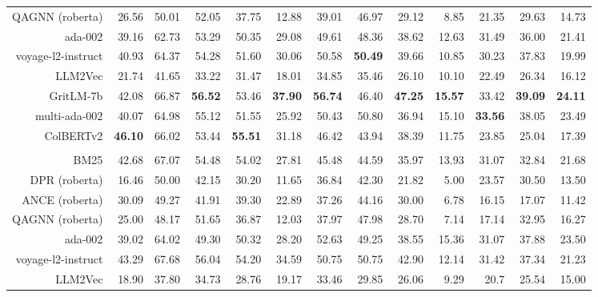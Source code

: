 \begin{table}[t]
{\begin{tabular}{r|rrrr|rrrr|rrrr}
        QAGNN (roberta) & 26.56 & 50.01 & 52.05 & 37.75 & 12.88 & 39.01 & 46.97 & 29.12 & 8.85 & 21.35 & 29.63 & 14.73 \\
        ada-002 & 39.16 & 62.73 & 53.29 & 50.35 & 29.08 & 49.61 & 48.36 & 38.62 & 12.63 & 31.49 & 36.00 & 21.41 \\
        voyage-l2-instruct & 40.93 & 64.37 & 54.28 & 51.60 & 30.06 &  50.58 & \textbf{50.49} & 39.66 & 10.85 & 30.23 & 37.83 & 19.99 \\ 
        LLM2Vec & 21.74 & 41.65 & 33.22 & 31.47 & 18.01 & 34.85 & 35.46 & 26.10 & 10.10 & 22.49 & 26.34 & 16.12 \\
        GritLM-7b & 42.08 & 66.87 & \textbf{56.52} & 53.46 & \textbf{37.90} & \textbf{56.74} & 46.40 & \textbf{47.25} & \textbf{15.57} & 33.42 & \textbf{39.09} & \textbf{24.11} \\
        multi-ada-002 & 40.07 & 64.98 & 55.12 & 51.55 & 25.92 & 50.43 & 50.80 & 36.94 & 15.10 & \textbf{33.56} & 38.05 & 23.49 \\
        ColBERTv2 & \textbf{46.10} & 66.02 & 53.44 & \textbf{55.51} & 31.18 & 46.42 & 43.94 & 38.39 & 11.75 & 23.85 & 25.04 & 17.39 \\
        \hline
        \rowcolor{green!8} \multicolumn{13}{c}{\textbf{Random 10\% Sample}} \\
        \hline
        BM25 & 42.68 & 67.07 & 54.48 & 54.02 & 27.81 & 45.48 & 44.59 & 35.97 & 13.93 & 31.07 & 32.84 & 21.68 \\
        DPR (roberta) & 16.46 & 50.00 & 42.15 & 30.20 & 11.65 & 36.84 & 42.30 & 21.82 & 5.00 & 23.57 & 30.50 & 13.50 \\
        ANCE (roberta) & 30.09 & 49.27 & 41.91 & 39.30 & 22.89 & 37.26 &44.16 & 30.00 & 6.78 & 16.15 & 17.07 & 11.42 \\
        QAGNN (roberta) & 25.00 & 48.17 & 51.65 & 36.87 & 12.03 & 37.97 & 47.98 & 28.70 & 7.14 & 17.14 & 32.95 & 16.27 \\
        ada-002 & 39.02 & 64.02 & 49.30 & 50.32 & 28.20 & 52.63 & 49.25 & 38.55 & 15.36 & 31.07 & 37.88 & 23.50 \\
        voyage-l2-instruct & 43.29 & 67.68 & 56.04 & 54.20 & 34.59 & 50.75 & 50.75 & 42.90 & 12.14 & 31.42 & 37.34 & 21.23 \\
        LLM2Vec & 18.90 & 37.80 & 34.73 & 28.76 & 19.17 & 33.46 & 29.85 & 26.06 & 9.29 & 20.7 & 25.54 & 15.00 \\

\end{tabular}}
\end{table}
